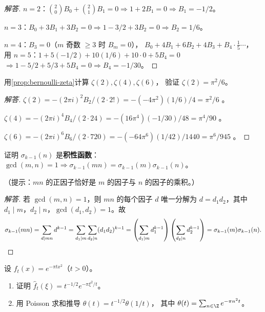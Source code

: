 \begin{proof}[解答]
$n=2$：$\binom{2}{0}B_0 + \binom{2}{1}B_1 = 0 \Rightarrow 1 + 2B_1 = 0 \Rightarrow B_1 = -1/2$。

$n=3$：$B_0 + 3B_1 + 3B_2 = 0 \Rightarrow 1 - 3/2 + 3B_2 = 0 \Rightarrow B_2 = 1/6$。

$n=4$：$B_3 = 0$（$m$ 奇数 $\geq 3$ 时 $B_m = 0$），
$B_0 + 4B_1 + 6B_2 + 4B_3 + B_4 \cdot \frac{1}{5}\cdots$，
用 $n=5$：$1 + 5(-1/2) + 10(1/6) + 10 \cdot 0 + 5B_4 = 0$
$\Rightarrow 1 - 5/2 + 5/3 + 5B_4 = 0 \Rightarrow B_4 = -1/30$。
\end{proof}

\begin{exercise}
\label{ex:ch2-zeta-2}
用\cref{prop:bernoulli-zeta}计算 $\zeta(2), \zeta(4), \zeta(6)$，
验证 $\zeta(2) = \pi^2/6$。
\end{exercise}

\begin{proof}[解答]
$\zeta(2) = -(2\pi i)^2 B_2 / (2 \cdot 2!) = -(-4\pi^2)(1/6)/4 = \pi^2/6$ \checkmark。

$\zeta(4) = -(2\pi i)^4 B_4/(2 \cdot 24) = -(16\pi^4)(-1/30)/48 = \pi^4/90$ \checkmark。

$\zeta(6) = -(2\pi i)^6 B_6/(2 \cdot 720) = -(-64\pi^6)(1/42)/1440 = \pi^6/945$ \checkmark。
\end{proof}

\begin{exercise}
\label{ex:ch2-sigma-multiplicative}
证明 $\sigma_{k-1}(n)$ 是\textbf{积性函数}：$\gcd(m,n)=1 \Rightarrow \sigma_{k-1}(mn) = \sigma_{k-1}(m)\sigma_{k-1}(n)$。

（提示：$mn$ 的正因子恰好是 $m$ 的因子与 $n$ 的因子的乘积。）
\end{exercise}

\begin{proof}[解答]
若 $\gcd(m,n)=1$，则 $mn$ 的每个因子 $d$ 唯一分解为 $d = d_1 d_2$，其中 $d_1 \mid m$，$d_2 \mid n$，$\gcd(d_1, d_2) = 1$。故
\[
  \sigma_{k-1}(mn) = \sum_{d \mid mn} d^{k-1}
  = \sum_{d_1 \mid m}\sum_{d_2 \mid n} (d_1 d_2)^{k-1}
  = \left(\sum_{d_1 \mid m} d_1^{k-1}\right)\left(\sum_{d_2 \mid n} d_2^{k-1}\right)
  = \sigma_{k-1}(m)\sigma_{k-1}(n). \qedhere
\]
\end{proof}

\begin{exercise}
\label{ex:ch2-poisson-gaussian}
设 $f_t(x) = e^{-\pi t x^2}$（$t > 0$）。
\begin{enumerate}
  \item 证明 $\hat{f}_t(\xi) = t^{-1/2} e^{-\pi\xi^2/t}$。
  \item 用 Poisson 求和推导 $\theta(t) = t^{-1/2}\theta(1/t)$，
    其中 $\theta(t) = \sum_{n \in \Z} e^{-\pi n^2 t}$。
\end{enumerate}
\end{exercise}


